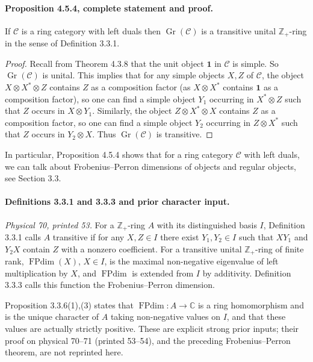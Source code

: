 \documentclass[11pt]{article}
\DeclareMathOperator{\FPdim}{FPdim}
\DeclareMathOperator{\Gr}{Gr}
\newcommand{\Cat}{\mathcal C}
\newcommand{\unit}{\mathbf 1}
\begin{document}
\paragraph{Proposition 4.5.4, complete statement and proof.}
If $\Cat$ is a ring category with left duals then $\Gr(\Cat)$ is a
transitive unital $\mathbb Z_+$-ring in the sense of Definition 3.3.1.
\begin{proof}
Recall from Theorem 4.3.8 that the unit object $\unit$ in $\Cat$ is
simple. So $\Gr(\Cat)$ is unital. This implies that for any simple
objects $X,Z$ of $\Cat$, the object $X\otimes X^*\otimes Z$ contains
$Z$ as a composition factor (as $X\otimes X^*$ contains $\unit$ as a
composition factor), so one can find a simple object $Y_1$ occurring in
$X^*\otimes Z$ such that $Z$ occurs in $X\otimes Y_1$. Similarly,
the object $Z\otimes X^*\otimes X$ contains $Z$ as a composition
factor, so one can find a simple object $Y_2$ occurring in $Z\otimes X^*$
such that $Z$ occurs in $Y_2\otimes X$. Thus $\Gr(\Cat)$ is transitive.
\end{proof}
In particular, Proposition 4.5.4 shows that for a ring category $\Cat$
with left duals, we can talk about Frobenius--Perron dimensions of
objects and regular objects, see Section 3.3.

\paragraph{Definitions 3.3.1 and 3.3.3 and prior character input.}
\emph{Physical 70, printed 53.}
For a $\mathbb Z_+$-ring $A$ with its distinguished basis $I$,
Definition 3.3.1 calls $A$ transitive if for any $X,Z\in I$ there exist
$Y_1,Y_2\in I$ such that $XY_1$ and $Y_2X$ contain $Z$ with a
nonzero coefficient. For a transitive unital $\mathbb Z_+$-ring of
finite rank, $\FPdim(X)$, $X\in I$, is the maximal non-negative
eigenvalue of left multiplication by $X$, and $\FPdim$ is extended
from $I$ by additivity. Definition 3.3.3 calls this function the
Frobenius--Perron dimension.

Proposition 3.3.6(1),(3) states that $\FPdim:A\to\mathbb C$ is a ring
homomorphism and is the unique character of $A$ taking non-negative
values on $I$, and that these values are actually strictly positive.
These are explicit strong prior inputs; their proof on physical 70--71
(printed 53--54), and the preceding Frobenius--Perron theorem, are not
reprinted here.
\end{document}
